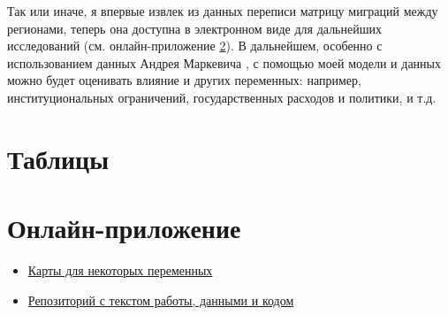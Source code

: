 \documentclass[a4paper,12pt]{article}
\let\oldsection\section
\renewcommand\section{\clearpage\oldsection}
\begin{document}
Так или иначе, я впервые извлек из данных переписи матрицу миграций между регионами, теперь она доступна в электронном виде для дальнейших исследований (см. онлайн-приложение \ref{app:online}). В дальнейшем, особенно с использованием данных Андрея Маркевича \citeyear{markevich_regional_2019}, с помощью моей модели и данных можно будет оценивать влияние и других переменных: например, институциональных ограничений, государственных расходов и политики, и т.д.

\clearpage\printbibliography


\clearpage\appendix


\section{Таблицы}






\oldsection{Онлайн-приложение}\label{app:online}

\begin{itemize}
	\item 
	\href{https://russia-migrations-1897.herokuapp.com}{Карты для некоторых переменных}
	\item \href{https://github.com/fant0md/empire-migrations-coursework}{Репозиторий с текстом работы, данными и кодом}
\end{itemize}
\end{document}

